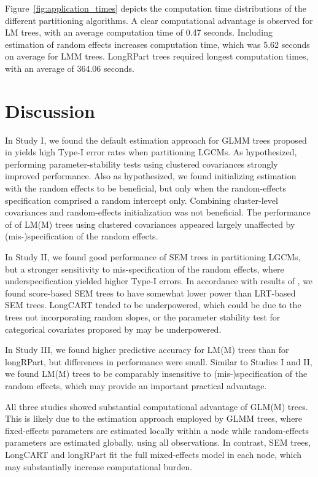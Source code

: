 \documentclass[doc,floatsintext,natbib]{apa7}
\begin{document}
Figure~\ref{fig:application_times} depicts the computation time distributions of the different partitioning algorithms. A clear computational advantage is observed for LM trees, with an average computation time of 0.47 seconds. Including estimation of random effects increases computation time, which was 5.62 seconds on average for LMM trees. LongRPart trees required longest computation times, with an average of 364.06 seconds. 




\section{Discussion}

In Study I, we found the default estimation approach for GLMM trees proposed in \cite{FokkySmit18} yields high Type-I error rates when partitioning LGCMs. As hypothesized, performing parameter-stability tests using clustered covariances strongly improved performance. Also as hypothesized, we found initializing estimation with the random effects to be beneficial, but only when the random-effects specification comprised a random intercept only. Combining cluster-level covariances and random-effects initialization was not beneficial. The performance of of LM(M) trees using clustered covariances appeared largely unaffected by (mis-)specification of the random effects.

In Study II, we found good performance of SEM trees in partitioning LGCMs, but a stronger sensitivity to mis-specification of the random effects, where underspecification yielded higher Type-I errors. In accordance with results of \cite{ArnoyVoel21}, we found score-based SEM trees to have somewhat lower power than LRT-based SEM trees. LongCART tended to be underpowered, which could be due to the trees not incorporating random slopes, or the parameter stability test for categorical covariates proposed by \cite{KundyHare19} may be underpowered.  

In Study III, we found higher predictive accuracy for LM(M) trees than for longRPart, but differences in performance were small. Similar to Studies I and II, we found LM(M) trees to be comparably insensitive to (mis-)specification of the random effects, which may provide an important practical advantage. 

All three studies showed substantial computational advantage of GLM(M) trees. This is likely due to the estimation approach employed by GLMM trees, where fixed-effects parameters are estimated locally within a node while random-effects parameters are estimated globally, using all observations. In contrast, SEM trees, LongCART and longRPart fit the full mixed-effects model in each node, which may substantially increase computational burden. 
\end{document}
